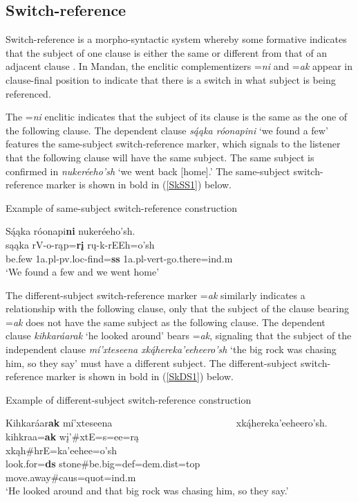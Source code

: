 \subsection{Switch-reference}\label{SkSR}

Switch-reference is a morpho-syntactic system whereby some formative indicates that the subject of one clause is either the same or different from that of an adjacent clause \citet[ix]{haimanmunro1983}. In Mandan, the enclitic complementizers =\textit{ni} and =\textit{ak} appear in clause-final position to indicate that there is a switch in what subject is being referenced.

The =\textit{ni} enclitic indicates that the subject of its clause is the same as the one of the following clause. The dependent clause \textit{są́ąka róonapi{ni}} `we found a few' features the same-subject switch-reference marker, which signals to the listener that the following clause will have the same subject. The same subject is confirmed in \textit{nukeréeho'sh} `we went back [home].' The same-subject switch-reference marker is shown in bold in (\ref{SkSS1}) below.

\begin{exe}
    \item\label{SkSS1} Example of same-subject switch-reference construction

    \glll Są́ąka róonapi\textbf{ni} nukeréeho'sh.\\
    sąąka rV-o-rąp=\textbf{rį} rų-k-rEEh=o'sh\\
    \textnormal{be.few} 1a.pl-pv.loc-\textnormal{find}=\textbf{ss} 1a.pl-vert-\textnormal{go.there}=ind.m\\
    \glt `We found a few and we went home' \citep[470]{hollow1970}
\end{exe}

The different-subject switch-reference marker =\textit{ak} similarly indicates a relationship with the following clause, only that the subject of the clause bearing =\textit{ak} does not have the same subject as the following clause. The dependent clause \textit{kihkaráarak} `he looked around' bears =\textit{ak}, signaling that the subject of the independent clause \textit{mí'xteseena xką́hereka'eeheero'sh} `the big rock was chasing him, so they say' must have a different subject. The different-subject switch-reference marker is shown in bold in (\ref{SkDS1}) below.

\begin{exe}
    \item\label{SkDS1} Example of different-subject switch-reference construction

    \glll Kihkaráar\textbf{ak} mí'xteseena ~ ~ ~ ~ ~ ~ ~ ~ ~ ~ ~ ~ ~ ~ ~ xką́hereka'eeheero'sh.\\
    kihkraa=\textbf{ak} wį'\#xtE=s=ee=rą ~ ~ ~ ~ ~ ~ ~ ~ ~ ~ ~ ~ ~ ~ ~ xkąh\#hrE=ka'eehee=o'sh\\
    \textnormal{look.for}=\textbf{ds} \textnormal{stone}\#\textnormal{be.big}=def=dem.dist=top ~ ~ ~ ~ ~ ~ ~ ~ ~ ~ ~ ~ ~ ~ ~ \textnormal{move.away}\#caus=quot=ind.m\\
    \glt `He looked around and that big rock was chasing him, so they say.' \citep[18]{hollow1973a}
\end{exe}

